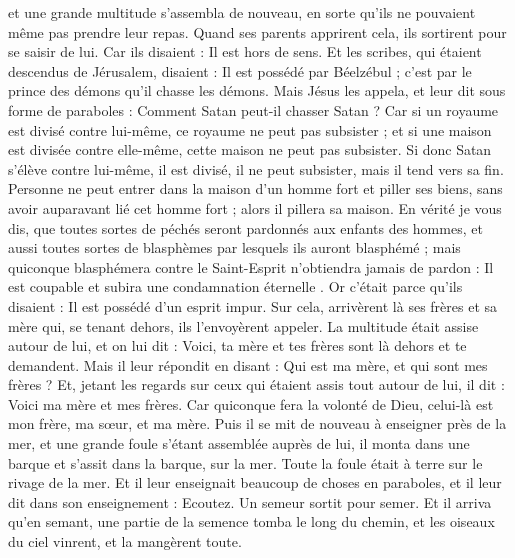 \begin{multicols}{2}
et une grande multitude s’assembla de nouveau, en sorte qu’ils ne pouvaient même pas prendre leur repas.
Quand ses parents apprirent cela, ils sortirent pour se saisir de lui. Car ils disaient : Il est hors de sens.
Et les scribes, qui étaient descendus de Jérusalem, disaient : Il est possédé par Béelzébul ; c’est par le prince des démons qu’il chasse les démons.
Mais Jésus les appela, et leur dit sous forme de paraboles : Comment Satan peut-il chasser Satan ?
Car si un royaume est divisé contre lui-même, ce royaume ne peut pas subsister ;
et si une maison est divisée contre elle-même, cette maison ne peut pas subsister.
Si donc Satan s'élève contre lui-même, il est divisé, il ne peut subsister, mais il tend vers sa fin.
Personne ne peut entrer dans la maison d'un homme fort et piller ses biens, sans avoir auparavant lié cet homme fort ; alors il pillera sa maison.
En vérité je vous dis, que toutes sortes de péchés seront pardonnés aux enfants des hommes, et aussi toutes sortes de blasphèmes par lesquels ils auront blasphémé ;
mais quiconque blasphémera contre le Saint-Esprit n’obtiendra jamais de pardon : Il est coupable et subira une condamnation éternelle .
Or c'était parce qu'ils disaient : Il est possédé d'un esprit impur.
Sur cela, arrivèrent là ses frères et sa mère qui, se tenant dehors, ils l'envoyèrent appeler. La multitude était assise autour de lui,
et on lui dit : Voici, ta mère et tes frères sont là dehors et te demandent.
Mais il leur répondit en disant : Qui est ma mère, et qui sont mes frères ?
Et, jetant les regards sur ceux qui étaient assis tout autour de lui, il dit : Voici ma mère et mes frères.
Car quiconque fera la volonté de Dieu, celui-là est mon frère, ma sœur, et ma mère.
\VerseOne{}Puis il se mit de nouveau à enseigner près de la mer, et une grande foule s’étant assemblée auprès de lui, il monta dans une barque et s’assit dans la barque, sur la mer. Toute la foule était à terre sur le rivage de la mer.
Et il leur enseignait beaucoup de choses en paraboles, et il leur dit dans son enseignement :
Ecoutez. Un semeur sortit pour semer.
Et il arriva qu'en semant, une partie de la semence tomba le long du chemin, et les oiseaux du ciel vinrent, et la mangèrent toute.

\end{multicols}
